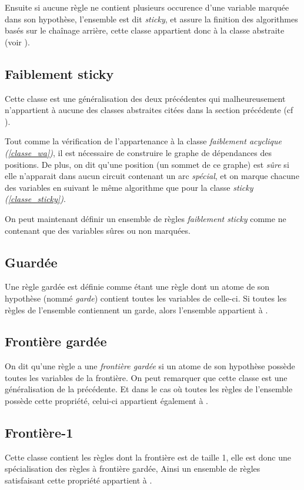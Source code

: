 Ensuite si aucune règle ne contient plusieurs occurence d'une variable marquée dans son
hypothèse, l'ensemble est dit {\em sticky}, et assure la finition des algorithmes basés
sur le chaînage arrière, cette classe appartient donc à la classe abstraite \fus (voir
\cite{nonguarded}).

\subsection{Faiblement sticky}\label{classe_ws}
Cette classe est une généralisation des deux précédentes qui malheureusement n'appartient
à aucune des classes abstraites citées dans la section précédente (cf \cite{nonguarded}).

Tout comme la vérification de l'appartenance à la classe {\em faiblement acyclique
(\ref{classe_wa})}, il est nécessaire de construire le graphe de dépendances des
positions. De plus, on dit qu'une position (un sommet de ce graphe) est {\em sûre} si
elle n'apparait dans aucun circuit contenant un arc {\em spécial}, et on marque chacune
des variables en suivant le même algorithme que pour la classe {\em sticky
(\ref{classe_sticky})}.

On peut maintenant définir un ensemble de règles {\em faiblement sticky} comme ne
contenant que des variables sûres ou non marquées.

\subsection{Guardée}\label{classe_guarded}
Une règle gardée est définie comme étant une règle 
dont un atome de son hypothèse (nommé {\em garde}) contient toutes les variables de celle-ci.
Si toutes les règles de l'ensemble contiennent un garde, alors l'ensemble appartient à
\gbts.

\subsection{Frontière gardée}\label{classe_frg}
On dit qu'une règle a une {\em frontière gardée} si un atome de son hypothèse possède toutes
les variables de la frontière.
On peut remarquer que cette classe est une généralisation de la précédente.
Et dans le cas où toutes les règles de l'ensemble possède cette propriété, celui-ci
appartient également à \gbts.

\subsection{Frontière-1}\label{classe_fr1}
Cette classe contient les règles dont la frontière est de taille 1,
elle est donc une spécialisation des règles à frontière gardée, 
Ainsi un ensemble de règles satisfaisant cette propriété appartient à \gbts.

